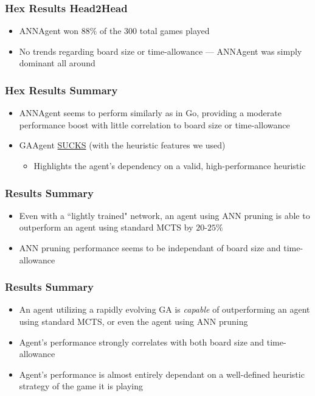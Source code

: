 \documentclass{beamer}
\begin{document}
\begin{frame}
\frametitle{Hex Results Head2Head}
\begin{itemize}
 \item ANNAgent won $88\%$ of the 300 total games played
 \item No trends regarding board size or time-allowance --- ANNAgent was simply dominant all around
\end{itemize}
\end{frame}

\begin{frame}
\frametitle{Hex Results Summary}
\begin{itemize}
 \item ANNAgent seems to perform similarly as in Go, providing a moderate performance boost with little correlation to board size or time-allowance
 \item GAAgent \underline{SUCKS} (with the heuristic features we used)
\begin{itemize}
 \item Highlights the agent's dependency on a valid, high-performance heuristic
\end{itemize}
\end{itemize}

\end{frame}

\begin{frame}
\frametitle{Results Summary}
\begin{itemize}
\item Even with a ``lightly trained" network, an agent using ANN pruning is able to outperform an agent using standard MCTS by $20$-$25\%$
\item ANN pruning performance seems to be independant of board size and time-allowance
\end{itemize}
\end{frame}

\begin{frame}
\frametitle{Results Summary}
\begin{itemize}
 \item An agent utilizing a rapidly evolving GA is \textit{capable} of outperforming an agent using standard MCTS, or even the agent using ANN pruning
 \item Agent's performance strongly correlates with both board size and time-allowance
 \item Agent's performance is almost entirely dependant on a well-defined heuristic strategy of the game it is playing
\end{itemize}
\end{frame}
\end{document}
